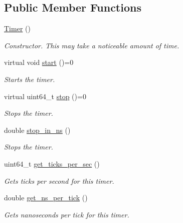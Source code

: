 \subsection*{Public Member Functions}
\begin{DoxyCompactItemize}
\item 
\hypertarget{classxmem_1_1timers_1_1_timer_a5f16e8da27d2a5a5242dead46de05d97}{}\hyperlink{classxmem_1_1timers_1_1_timer_a5f16e8da27d2a5a5242dead46de05d97}{Timer} ()\label{classxmem_1_1timers_1_1_timer_a5f16e8da27d2a5a5242dead46de05d97}

\begin{DoxyCompactList}\small\item\em Constructor. This may take a noticeable amount of time. \end{DoxyCompactList}\item 
\hypertarget{classxmem_1_1timers_1_1_timer_af94a88fb78dd9edf299d4421e17f5fb3}{}virtual void \hyperlink{classxmem_1_1timers_1_1_timer_af94a88fb78dd9edf299d4421e17f5fb3}{start} ()=0\label{classxmem_1_1timers_1_1_timer_af94a88fb78dd9edf299d4421e17f5fb3}

\begin{DoxyCompactList}\small\item\em Starts the timer. \end{DoxyCompactList}\item 
virtual uint64\+\_\+t \hyperlink{classxmem_1_1timers_1_1_timer_a3be174c5eb733a2974ce76c146874e1f}{stop} ()=0
\begin{DoxyCompactList}\small\item\em Stops the timer. \end{DoxyCompactList}\item 
double \hyperlink{classxmem_1_1timers_1_1_timer_ae215ce438bb77e6c66aba6620f1e475a}{stop\+\_\+in\+\_\+ns} ()
\begin{DoxyCompactList}\small\item\em Stops the timer. \end{DoxyCompactList}\item 
uint64\+\_\+t \hyperlink{classxmem_1_1timers_1_1_timer_a86ec138f64ed24929ea12b08455fd0c0}{get\+\_\+ticks\+\_\+per\+\_\+sec} ()
\begin{DoxyCompactList}\small\item\em Gets ticks per second for this timer. \end{DoxyCompactList}\item 
double \hyperlink{classxmem_1_1timers_1_1_timer_a220f44f7372cc596141a4ddbd28fdf81}{get\+\_\+ns\+\_\+per\+\_\+tick} ()
\begin{DoxyCompactList}\small\item\em Gets nanoseconds per tick for this timer. \end{DoxyCompactList}\end{DoxyCompactItemize}
